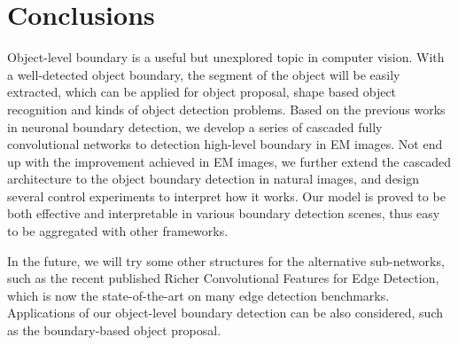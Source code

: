 \documentclass[senior]{IPSstyle}
\begin{document}
\chapter{Conclusions} \label{conclusions}

Object-level boundary is a useful but unexplored topic in computer vision. With a well-detected object boundary, the segment of the object will be easily extracted, which can be applied for object proposal, shape based object recognition and  kinds of object detection problems. Based on the previous works in neuronal boundary detection, we develop a series of cascaded fully convolutional networks to detection high-level boundary in EM images. Not end up with the improvement achieved in EM images, we further extend the cascaded architecture to the object boundary detection in natural images, and design several control experiments to interpret how it works. Our model is proved to be both effective and interpretable in various boundary detection scenes, thus easy to be aggregated with other frameworks.

In the future, we will try some other structures for the alternative sub-networks, such as the recent published Richer Convolutional Features for Edge Detection\cite{Liu2017}, which is now the state-of-the-art on many edge detection benchmarks. Applications of our object-level boundary detection can be also considered, such as the boundary-based object proposal\cite{Yang2016}. 









\end{document}
